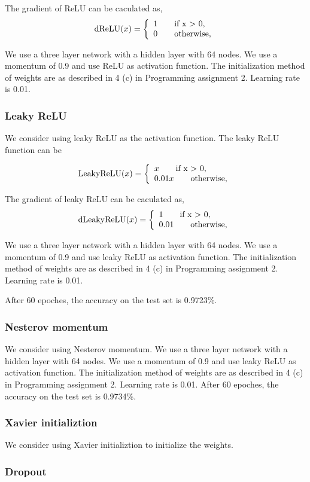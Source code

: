 \documentclass{article} %
\begin{document}
The gradient of ReLU can be caculated as,
 \[
\textnormal{dReLU}(x) =\left\{
\begin{array}{ll}
1 \qquad \textnormal{if x $>$ 0,}\\
0 \qquad \textnormal{otherwise,}
\end{array}
\right.
\]


We use a three layer network with a hidden layer with 64 nodes. We use a momentum of 0.9 and use ReLU as activation function. The initialization method of weights are as described in 4 (c) in Programming assignment 2. Learning rate is 0.01.



\subsubsection{Leaky ReLU}

We consider using leaky ReLU as the activation function. The leaky ReLU function can be 

\[
\textnormal{LeakyReLU}(x) =\left\{
\begin{array}{ll}
x \qquad \textnormal{if x $>$ 0,}\\
0.01x \qquad \textnormal{otherwise,}
\end{array}
\right.
\]

The gradient of leaky ReLU can be caculated as,
\[
\textnormal{dLeakyReLU}(x) =\left\{
\begin{array}{ll}
1 \qquad \textnormal{if x $>$ 0,}\\
0.01 \qquad \textnormal{otherwise,}
\end{array}
\right.
\]



We use a three layer network with a hidden layer with 64 nodes. We use a momentum of 0.9 and use leaky ReLU as activation function. The initialization method of weights are as described in 4 (c) in Programming assignment 2. Learning rate is 0.01.

After 60 epoches, the accuracy on the test set is 0.9723\%.

\subsubsection{Nesterov momentum}
We consider using Nesterov momentum. We use a three layer network with a hidden layer with 64 nodes. We use a momentum of 0.9 and use leaky ReLU as activation function. The initialization method of weights are as described in 4 (c) in Programming assignment 2. Learning rate is 0.01. After 60 epoches, the accuracy on the test set is 0.9734\%.

\subsubsection{Xavier initializtion}
We consider using Xavier initializtion to initialize the weights.


\subsubsection{Dropout}
\end{document}
